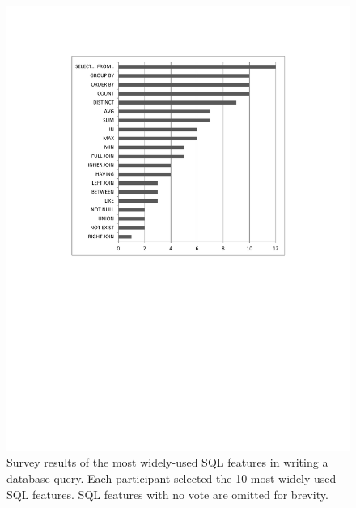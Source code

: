 
\begin{figure}[t]
  \centering
  \includegraphics[scale=0.55]{survey}
  \vspace*{-3.0ex}\caption {{\label{fig:survey}
  Survey results of the most widely-used SQL features
  in writing a database query. Each participant
  selected the 10 most widely-used SQL features.
  SQL features with no vote are omitted 
  for brevity.
}}
\vspace{-1mm}
\end{figure}

\newcommand{\q}{\langle query\rangle}
\newcommand{\db}{\langle db\rangle}
\newcommand{\pat}{\langle pat\rangle}
\newcommand{\bug}{\langle bug\rangle}
\newcommand{\dist}{\langle distance\rangle}
\newcommand{\sem}[1]{\llbracket #1\rrbracket}
\newcommand{\lit}[1]{\texttt{#1}}

\newcommand{\column}{\langle column\rangle}
\newcommand{\dbtable}{\langle table\rangle}
\newcommand{\cond}{\langle cond\rangle}
\newcommand{\op}{\langle op\rangle}
\newcommand{\e}{\langle expr\rangle}
\newcommand{\ce}{\langle cexpr\rangle}

